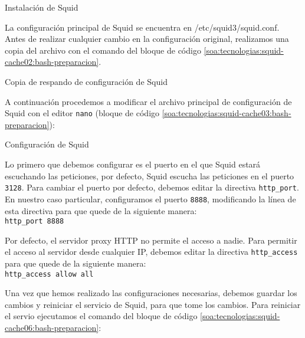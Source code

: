 \begin{listing}[H]
  \caption{Instalación de Squid}
  \label{soa:tecnologias:squid-cache01:bash-preparacion}
\end{listing}

La configuración principal de Squid se encuentra en /etc/squid3/squid.conf.  Antes de realizar cualquier cambio en la configuración original, realizamos una copia del archivo con el comando del bloque de código \autoref{soa:tecnologias:squid-cache02:bash-preparacion}.

\begin{listing}[H]
  \caption{Copia de respando de configuración de Squid}
  \label{soa:tecnologias:squid-cache02:bash-preparacion}
\end{listing}

A continuación procedemos a modificar el archivo principal de configuración de Squid con el editor \texttt{nano} (bloque de código \autoref{soa:tecnologias:squid-cache03:bash-preparacion}):

\begin{listing}[H]
  \caption{Configuración de Squid}
  \label{soa:tecnologias:squid-cache03:bash-preparacion}
\end{listing}

Lo primero que debemos configurar es el puerto en el que Squid estará escuchando las peticiones, por defecto, Squid escucha las peticiones en el puerto \texttt{3128}.  Para cambiar el puerto por defecto, debemos editar la directiva \verb|http_port|.  En nuestro caso particular, configuramos el puerto \texttt{8888}, modificando la línea de esta directiva para que quede de la siguiente manera:\\ \verb|http_port 8888|

Por defecto, el servidor proxy HTTP no permite el acceso a nadie.  Para permitir el acceso al servidor desde cualquier IP, debemos editar la directiva \verb|http_access| para que quede de la siguiente manera:\\
\verb|http_access allow all|

Una vez que hemos realizado las configuraciones necesarias, debemos guardar los cambios y reiniciar el servicio de Squid, para que tome los cambios.  Para reiniciar el servio ejecutamos el comando del bloque de código \autoref{soa:tecnologias:squid-cache06:bash-preparacion}:

